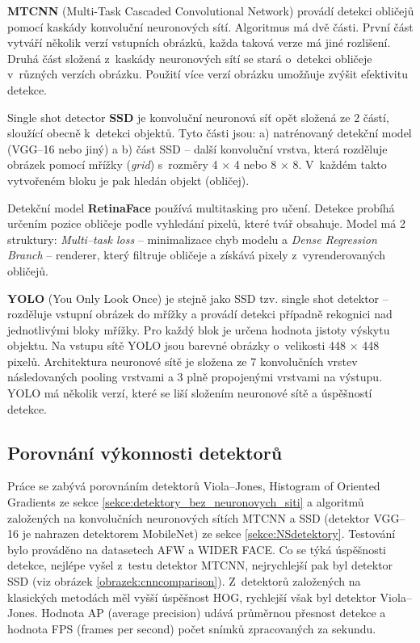 \textbf{MTCNN} (Multi-Task Cascaded Convolutional Network) \cite{fdCNNComparison, MTCNN} provádí detekci obličejů pomocí kaskády konvoluční neuronových sítí. Algoritmus má dvě části. První část vytváří několik verzí vstupních obrázků, každa taková verze má jiné rozlišení. Druhá část složená z~kaskády neuronových sítí se stará o~detekci obličeje v~různých verzích obrázku. Použití více verzí obrázku umožňuje zvýšit efektivitu detekce.

Single shot detector \textbf{SSD} \cite{ssd} je konvoluční neuronová síť opět složená ze 2 částí, sloužící obecně k~detekci objektů. Tyto části jsou: a) natrénovaný detekční model (VGG--16 nebo jiný) a b) část SSD -- další konvoluční vrstva, která rozděluje obrázek pomocí mřížky (\emph{grid}) s~rozměry 4 $\times$ 4 nebo 8 $\times$ 8. V~každém takto vytvořeném bloku je pak hledán objekt (obličej).

Detekční model \textbf{RetinaFace} \cite{lowLightFdReview} používá multitasking pro učení. Detekce probíhá určením pozice obličeje podle vyhledání pixelů, které tvář obsahuje. Model má 2 struktury: \emph{Multi--task loss} -- minimalizace chyb modelu a \emph{Dense Regression Branch} -- renderer, který filtruje obličeje a získává pixely z~vyrenderovaných obličejů.

\textbf{YOLO} (You Only Look Once) \cite{yolo} je stejně jako SSD tzv. single shot detektor -- rozděluje vstupní obrázek do mřížky a provádí detekci případně rekognici nad jednotlivými bloky mřížky. Pro každý blok je určena hodnota jistoty výskytu objektu. Na vstupu sítě YOLO jsou barevné obrázky o~velikosti 448 $\times$ 448 pixelů. Architektura neuronové sítě je složena ze 7 konvolučních vrstev následovaných pooling vrstvami a 3 plně propojenými vrstvami na výstupu.
YOLO má několik verzí, které se liší složením neuronové sítě a úspěšností detekce.

\subsection*{Porovnání výkonnosti detektorů}
Práce \cite{fdCNNComparison} se zabývá porovnáním detektorů Viola--Jones, Histogram of Oriented Gradients ze sekce \ref{sekce:detektory_bez_neuronovych_siti} a algoritmů založených na konvolučních neuronových sítích MTCNN a SSD (detektor VGG--16 je nahrazen detektorem MobileNet) ze sekce \ref{sekce:NSdetektory}. Testování bylo prováděno na datasetech AFW a WIDER FACE. Co se týká úspěšnosti detekce, nejlépe vyšel z~testu detektor MTCNN, nejrychlejší pak byl detektor SSD (viz obrázek \ref{obrazek:cnncomparison}). Z~detektorů založených na klasických metodách měl vyšší úspěšnost HOG, rychlejší však byl detektor Viola--Jones. Hodnota AP (average precision) udává průměrnou přesnost detekce a hodnota FPS (frames per second) počet snímků zpracovaných za sekundu.


